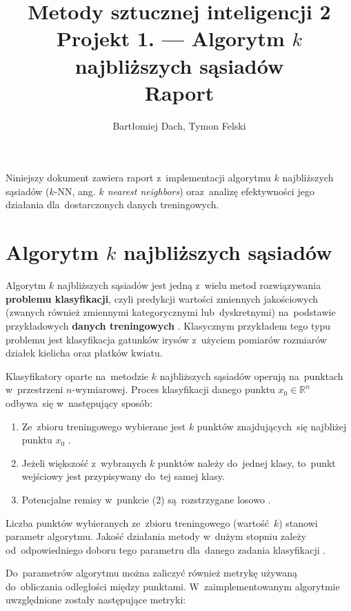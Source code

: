 \documentclass[11pt,a4paper]{article}
\begin{document}
\title{Metody sztucznej inteligencji 2 \\
\Large{
    Projekt 1. --- Algorytm $k$ najbliższych sąsiadów \\
    Raport
}}
\author{Bartłomiej Dach, Tymon Felski}
\maketitle

Niniejszy dokument zawiera raport z~implementacji algorytmu $k$ najbliższych sąsiadów ($k$-NN, ang. \emph{$k$ nearest neighbors}) oraz~analizę efektywności jego działania dla~dostarczonych danych treningowych.

\section{Algorytm $k$ najbliższych sąsiadów}

Algorytm $k$ najbliższych sąsiadów jest jedną z~wielu metod rozwiązywania \textbf{problemu klasyfikacji}, czyli predykcji wartości zmiennych jakościowych (zwanych również zmiennymi kategorycznymi lub~dyskretnymi) na~podstawie przykładowych \textbf{danych treningowych} \cite[s.~9--10]{hastie2009}.
Klasycznym przykładem tego typu problemu jest klasyfikacja gatunków irysów z~użyciem pomiarów rozmiarów działek kielicha oraz płatków kwiatu.

Klasyfikatory oparte na~metodzie $k$ najbliższych sąsiadów operują na~punktach w~przestrzeni $n$-wymiarowej.
Proces klasyfikacji danego punktu $x_0 \in \mathbb{R}^n$ odbywa~się w~następujący sposób:

\begin{enumerate}
    \item Ze~zbioru treningowego wybierane jest $k$ punktów znajdujących~się najbliżej punktu $x_0$ \cite[s.~261]{vapnik1998}.
    \item Jeżeli większość z~wybranych $k$ punktów należy do~jednej klasy, to~punkt wejściowy jest przypisywany do~tej samej klasy.
    \item Potencjalne remisy w~punkcie (2) są~rozstrzygane losowo \cite[s.~463--464]{hastie2009}.
\end{enumerate}

Liczba punktów wybieranych ze~zbioru treningowego (wartość~$k$) stanowi parametr algorytmu.
Jakość działania metody w~dużym stopniu zależy od~odpowiedniego doboru tego parametru dla~danego zadania klasyfikacji \cite[s.~468--470]{hastie2009}.

Do~parametrów algorytmu można zaliczyć również metrykę używaną do~obliczania odległości między punktami.
W~zaimplementowanym algorytmie uwzględnione zostały następujące metryki:
\end{document}
